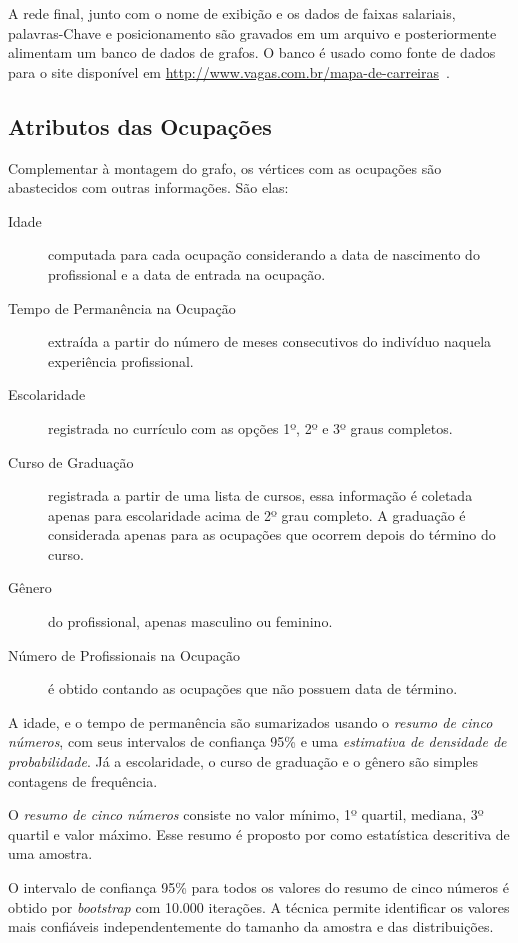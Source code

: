 \documentclass[12pt,a4paper]{article}
\begin{document}
A rede final, junto com o nome de exibição e os dados de faixas salariais, palavras-Chave e posicionamento são gravados em um arquivo e posteriormente alimentam um banco de dados de grafos. O banco é usado como fonte de dados para o site disponível em \url{http://www.vagas.com.br/mapa-de-carreiras}~\cite{VAGAS_Tecnologia2014-yv}.


\subsection{Atributos das Ocupações}

Complementar à montagem do grafo, os vértices com as ocupações são abastecidos com outras informações. São elas:

\begin{description}
  \item[Idade] computada para cada ocupação considerando a data de nascimento do profissional e a data de entrada na ocupação.
  \item[Tempo de Permanência na Ocupação] extraída a partir do número de meses consecutivos do indivíduo naquela experiência profissional.
  \item[Escolaridade] registrada no currículo com as opções 1º, 2º e 3º graus completos.
  \item[Curso de Graduação] registrada a partir de uma lista de cursos, essa informação é coletada apenas para escolaridade acima de 2º grau completo. A graduação é considerada apenas para as ocupações que ocorrem depois do término do curso.
  \item[Gênero] do profissional, apenas masculino ou feminino.
  \item[Número de Profissionais na Ocupação] é obtido contando as ocupações que não possuem data de término.
\end{description}

A idade, e o tempo de permanência são sumarizados usando o \textit{resumo de cinco números}, com seus intervalos de confiança 95\% e uma \textit{estimativa de densidade de probabilidade}. Já a escolaridade, o curso de graduação e o gênero são simples contagens de frequência.

O \textit{resumo de cinco números} consiste no valor mínimo, 1º quartil, mediana, 3º quartil e valor máximo. Esse resumo é proposto por  como estatística descritiva de uma amostra.

O intervalo de confiança 95\% para todos os valores do resumo de cinco números é obtido por \textit{bootstrap} com 10.000 iterações. A técnica permite identificar os valores mais confiáveis independentemente do tamanho da amostra e das distribuições.
\end{document}
